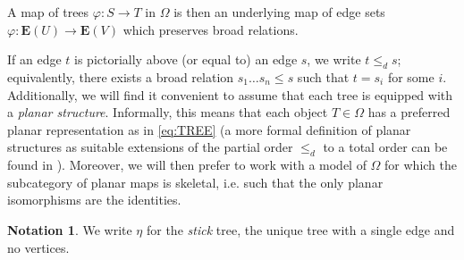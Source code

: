 \documentclass[a4paper,10pt]{article}%
\numberwithin{equation}{section}
\numberwithin{figure}{section}
\theoremstyle{definition} %
\newtheorem{notation}[equation]{Notation}%
\newcommand{\1}{\ensuremath{\mathbbm 1}}%
\begin{document}
A map of trees $\varphi \colon S \to T$
in $\Omega$ is then an underlying map
of edge sets 
$\varphi \colon \boldsymbol{E}(U) \to \boldsymbol{E}(V)$
which preserves broad relations.



If an edge $t$ is pictorially above (or equal to) an edge $s$, we write $t \leq_d s$;
equivalently, there exists a broad relation $s_1\dots s_n \leq s$ such that $t = s_i$ for some $i$.
\\

Additionally, we will find it convenient to assume that 
each tree is equipped with a \textit{planar structure}.
Informally, 
this means that each object $T \in \Omega$
has a preferred planar representation as in \eqref{eq:TREE}
(a more formal definition of planar structures as
suitable extensions of the partial order $\leq_d$ to a total order
can be found in \cite[\S 3.1]{BP_geo}).
Moreover, we will then prefer to work with a model of $\Omega$
for which the subcategory of planar maps is skeletal,
i.e. such that the only planar isomorphisms are the identities.




\begin{notation}
      We write $\eta$ for the \textit{stick} tree, the unique tree with a single edge and no vertices.
\end{notation}
\end{document}

